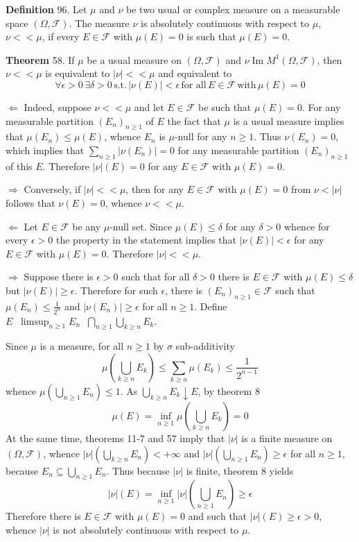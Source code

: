 \documentclass[a4paper]{article}
\newcommand{\brac}[1]{\left ( #1 \right )}
\newcommand{\abs}[1]{\left | #1 \right |}
\newcommand{\Fcal}{\mathcal{F}}
\newcommand{\defn}{\mathop{\overset{\Delta}{=}}\nolimits}
\newcommand{\im}{\operatorname{Im}\nolimits}
\begin{document}
\noindent \textbf{Definition} 96.
Let $\mu$ and $\nu$ be two usual or complex measure on a measurable space $\brac{\Omega, \Fcal}$. The measure $\nu$ is absolutely continuous with respect to $\mu$, $\nu<<\mu$, if every $E\in \Fcal$ with $\mu\brac{E} = 0$ is such that $\mu\brac{E}=0$.

\label{thm:meas_abs_cont_equiv} \noindent \textbf{Theorem} 58.
If $\mu$ be a usual measure on $\brac{\Omega, \Fcal}$ and $\nu\im M^1\brac{\Omega, \Fcal}$, then $\nu<<\mu$ is equivalent to $\abs{\nu}<<\mu$ and equivalent to \[\forall \epsilon>0\,\exists \delta>0\,\text{s.t.}\,\abs{\nu\brac{E}}<\epsilon\,\text{for all}\, E\in \Fcal\,\text{with}\,\mu\brac{E}=0\]

$\Leftarrow$ Indeed, suppose $\nu<<\mu$ and let $E\in\Fcal$ be such that $\mu\brac{E}=0$. For any measurable partition $\brac{E_n}_{n\geq 1}$ of $E$ the fact that $\mu$ is a usual measure implies that $\mu\brac{E_n}\leq \mu\brac{E}$, whence $E_n$ is $\mu$-null for any $n\geq 1$. Thus $\nu\brac{E_n}=0$, which implies that $\sum_{n\geq 1} \abs{\nu\brac{E_n}} = 0$ for any measurable partition $\brac{E_n}_{n\geq 1}$ of this $E$. Therefore $\abs{\nu}\brac{E}=0$ for any $E\in \Fcal$ with $\mu\brac{E}=0$.

$\Rightarrow$ Conversely, if $\abs{\nu}<<\mu$, then for any $E\in \Fcal$ with $\mu\brac{E}=0$ from $\nu < \abs{\nu}$ follows that $\nu\brac{E}=0$, whence $\nu<<\mu$.

$\Leftarrow$ Let $E\in \Fcal$ be any $\mu$-null set. Since $\mu\brac{E}\leq \delta$ for any $\delta>0$ whence for every $\epsilon>0$ the property in the statement implies that $\abs{\nu\brac{E}}<\epsilon$ for any $E\in \Fcal$ with $\mu\brac{E}=0$. Therefore $\abs{\nu}<<\mu$.

$\Rightarrow$ Suppose there is $\epsilon>0$ such that for all $\delta>0$ there is $E\in \Fcal$ with $\mu\brac{E}\leq \delta$ but $\abs{\nu\brac{E}}\geq \epsilon$. Therefore for such $\epsilon$, there is $\brac{E_n}_{n\geq1}\in \Fcal$ such that $\mu\brac{E_n}\leq \frac{1}{2^n}$ and $\abs{\nu\brac{E_n}}\geq \epsilon$ for all $n\geq 1$. Define $E\defn \limsup_{n\geq 1} E_n \defn \bigcap_{n\geq 1} \bigcup_{k\geq n} E_k$.

Since $\mu$ is a measure, for all $n\geq 1$ by $\sigma$ sub-additivity \[\mu\brac{\bigcup_{k\geq n} E_k}\leq \sum_{k\geq n}\mu\brac{E_k} \leq \frac{1}{2^{n-1}}\] whence $\mu\brac{\bigcup_{n\geq 1}E_n}\leq 1$. As $\bigcup_{k\geq n} E_k \downarrow E$, by theorem 8 \[\mu\brac{E}=\inf_{n\geq 1}\mu\brac{\bigcup_{k\geq n} E_k } = 0\] At the same time, theorems 11-7 and 57 imply that $\abs{\nu}$ is a finite measure on $\brac{\Omega, \Fcal}$, whence $\abs{\nu}\brac{\bigcup_{k\geq n}E_n}<+\infty$ and $\abs{\nu}\brac{\bigcup_{n\geq 1}E_n}\geq \epsilon$ for all $n\geq1$, because $E_n\subseteq \bigcup_{n\geq 1}E_n$. Thus because $\abs{\nu}$ is finite, theorem 8 yields \[\abs{\nu}\brac{E} = \inf_{n\geq1} \abs{\nu}\brac{\bigcup_{n\geq 1}E_n} \geq \epsilon\] Therefore there is $E\in \Fcal$ with $\mu\brac{E}=0$ and such that $\abs{\nu}\brac{E}\geq \epsilon>0$, whence $\abs{\nu}$ is not absolutely continuous with respect to $\mu$.\\
\end{document}
